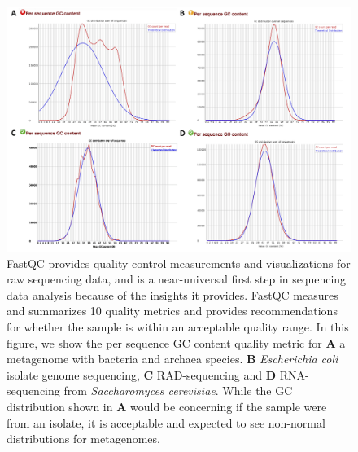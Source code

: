 \documentclass[10pt,letterpaper]{article}
\begin{document}
\begin{figure}
\includegraphics[width=.9\textwidth]{figures/fastqc.png}
\caption{FastQC provides quality control measurements and visualizations for raw sequencing data, and is a near-universal first step in sequencing data analysis because of the insights it provides.
FastQC measures and summarizes 10 quality metrics and provides recommendations for whether the sample is within an acceptable quality range. In this figure, we show the per sequence GC content quality metric for \textbf{A} a metagenome with bacteria and archaea species. \textbf{B} \textit{Escherichia coli} isolate genome sequencing, \textbf{C} RAD-sequencing and \textbf{D} RNA-sequencing from \textit{Saccharomyces cerevisiae}. While the GC distribution shown in \textbf{A} would be concerning if the sample were from an isolate, it is acceptable and expected to see non-normal distributions for metagenomes.} 
\label{fig:fastqc}
\end{figure}
\end{document}
